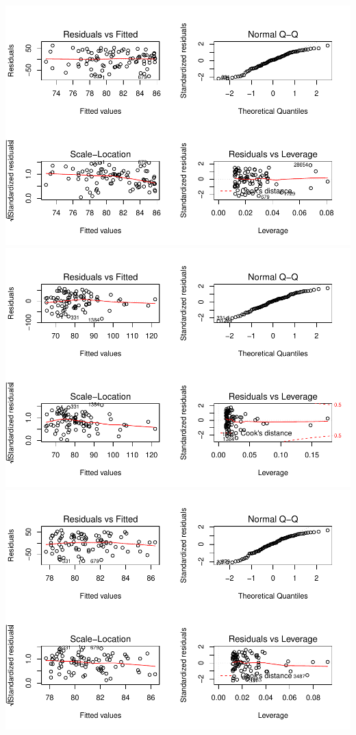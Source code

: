 \documentclass[]{article}
\begin{document}
\includegraphics{Desc_stats_files/figure-latex/unnamed-chunk-1-7.pdf}
\includegraphics{Desc_stats_files/figure-latex/unnamed-chunk-1-8.pdf}
\includegraphics{Desc_stats_files/figure-latex/unnamed-chunk-1-9.pdf}
\end{document}

